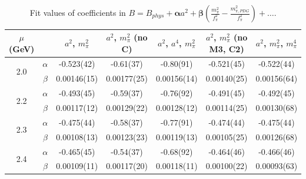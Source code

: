 \documentclass[12pt]{extarticle}
\begin{document}
\begin{table}[h!]
\begin{center}
\begin{tabular}{|c c|c|c|c|c|c|}
\hline
$\mu$ (GeV) &  & $a^2$, $m_\pi^2$& $a^2$, $m_\pi^2$ (no C)& $a^2$, $a^4$, $m_\pi^2$& $a^2$, $m_\pi^2$ (no M3, C2)& $a^2$, $m_\pi^2$, $m_\pi^4$\\
\hline
\multirow{2}{0.5in}{2.0} & $\alpha$ & -0.523(42)& -0.61(37)& -0.80(91)& -0.521(45)& -0.522(44)\\
 & $\beta$ & 0.00146(15)& 0.00177(25)& 0.00156(14)& 0.00140(25)& 0.00156(64)\\
\hline
\multirow{2}{0.5in}{2.2} & $\alpha$ & -0.493(45)& -0.59(37)& -0.76(92)& -0.491(45)& -0.492(45)\\
 & $\beta$ & 0.00117(12)& 0.00129(22)& 0.00128(12)& 0.00114(25)& 0.00130(68)\\
\hline
\multirow{2}{0.5in}{2.3} & $\alpha$ & -0.475(44)& -0.58(37)& -0.77(91)& -0.474(44)& -0.475(44)\\
 & $\beta$ & 0.00108(13)& 0.00123(23)& 0.00119(13)& 0.00105(25)& 0.00126(68)\\
\hline
\multirow{2}{0.5in}{2.4} & $\alpha$ & -0.465(45)& -0.54(37)& -0.68(92)& -0.464(46)& -0.466(46)\\
 & $\beta$ & 0.00109(11)& 0.00117(20)& 0.00118(11)& 0.00100(22)& 0.00093(63)\\
\hline
\end{tabular}
\caption{Fit values of coefficients in $B = B_{phys} + \mathbf{\alpha} a^2 + \mathbf{\beta}\left(\frac{m_\pi^2}{f_\pi^2}-\frac{m_{\pi,PDG}^2}{f_\pi^2}\right) + \ldots$.}
\end{center}
\end{table}




















\clearpage
\end{document}
